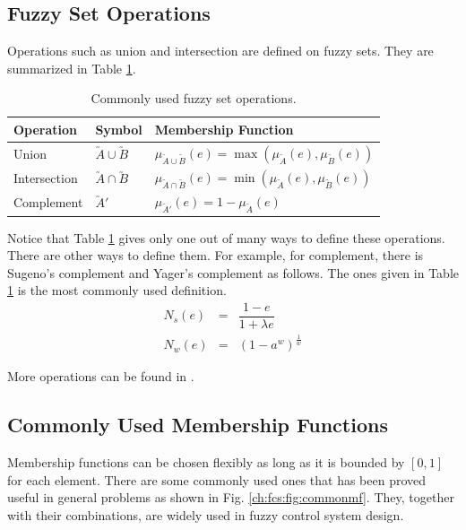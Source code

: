 \subsection{Fuzzy Set Operations}

Operations such as union and intersection are defined on fuzzy sets. They are summarized in Table \ref{ch:fcs:tab:fuzzysetoperation}.

\begin{table}[h]
	\centering
	\begin{tabular}{lll}
		\hline
		Operation & Symbol & Membership Function \\
		\hline
		Union & $\utilde{A} \cup \utilde{B}$ & $\mu_{\utilde{A} \cup \utilde{B}}(e) = \max(\mu_{\utilde{A}}(e), \mu_{\utilde{B}}(e))$ \\
		Intersection & $\utilde{A} \cap \utilde{B}$ & $\mu_{\utilde{A} \cap \utilde{B}}(e) = \min(\mu_{\utilde{A}}(e), \mu_{\utilde{B}}(e))$ \\
		Complement & $\utilde{A}'$ & $\mu_{\utilde{A}'}(e) = 1 - \mu_{\utilde{A}}(e)$ \\
		\hline
	\end{tabular}
	\caption{Commonly used fuzzy set operations.}
	\label{ch:fcs:tab:fuzzysetoperation}
\end{table}

Notice that Table \ref{ch:fcs:tab:fuzzysetoperation} gives only one out of many ways to define these operations. There are other ways to define them. For example, for complement, there is Sugeno's complement and Yager's complement as follows. The ones given in Table \ref{ch:fcs:tab:fuzzysetoperation} is the most commonly used definition.
\begin{eqnarray}
	N_s(e) &=& \dfrac{1-e}{1+\lambda e} \nonumber \\
	N_w(e) &=& (1-a^w)^{\frac{1}{w}} \nonumber
\end{eqnarray}

More operations can be found in \cite{mizumoto1981fuzzy}.

\subsection{Commonly Used Membership Functions}

Membership functions can be chosen flexibly as long as it is bounded by $[0, 1]$ for each element. There are some commonly used ones that has been proved useful in general problems as shown in Fig. \ref{ch:fcs:fig:commonmf}. They, together with their combinations, are widely used in fuzzy control system design.


